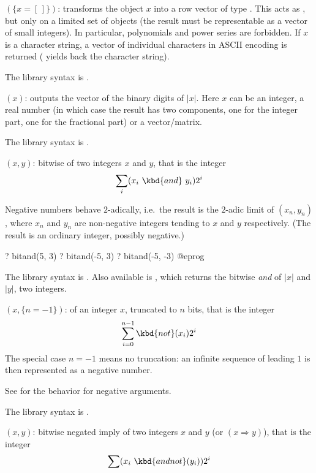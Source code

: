 $(\{x=[\,]\})$: \label{se:Vecsmall}
transforms the object $x$ into a row
vector of type . This acts as , but only on a
limited set of objects (the result must be representable as a vector of small
integers). In particular, polynomials and power series are forbidden.
If $x$ is a character string, a vector of individual characters in ASCII
encoding is returned ( yields back the character string).

The library syntax is .

$(x)$: \label{se:binary}
outputs the vector of the binary digits of $|x|$.
Here $x$ can be an integer, a real number (in which case the result has two
components, one for the integer part, one for the fractional part) or a
vector/matrix.

The library syntax is .

$(x,y)$: \label{se:bitand}
bitwise 
of two integers $x$ and $y$, that is the integer
$$\sum_i (x_i~\kbd{and}~y_i) 2^i$$

Negative numbers behave $2$-adically, i.e.~the result is the $2$-adic limit
of $(x_n,y_n)$, where $x_n$ and $y_n$ are non-negative integers
tending to $x$ and $y$ respectively. (The result is an ordinary integer,
possibly negative.)

\bprog
? bitand(5, 3)
? bitand(-5, 3)
? bitand(-5, -3)
@eprog

The library syntax is .
Also available is
, which returns the bitwise \emph{and}
of $|x|$ and $|y|$, two integers.

$(x,\{n=-1\})$: \label{se:bitneg}
 of an integer $x$,
truncated to $n$ bits, that is the integer $$\sum_{i=0}^{n-1} \kbd{not}(x_i)
2^i$$ The special case $n=-1$ means no truncation: an infinite sequence of
leading $1$ is then represented as a negative number.

See  for the behavior for negative arguments.

The library syntax is .

$(x,y)$: \label{se:bitnegimply}
bitwise negated imply of two integers $x$ and
$y$ (or  $(x \Rightarrow y)$), that is the integer $$\sum
(x_i~\kbd{and not}(y_i)) 2^i$$

